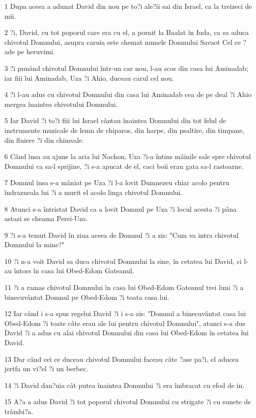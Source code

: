 \par 1 Dupa aceea a adunat David din nou pe to?i ale?ii sai din Israel, ca la treizeci de mii.
\par 2 ?i, David, cu tot poporul care era cu el, a pornit la Baalat în Iuda, ca sa aduca chivotul Domnului, asupra caruia este chemat numele Domnului Savaot Cel ce ?ade pe heruvimi.
\par 3 ?i punând chivotul Domnului într-un car nou, l-au scos din casa lui Aminadab; iar fiii lui Aminadab, Uza ?i Ahio, duceau carul cel nou.
\par 4 ?i l-au adus cu chivotul Domnului din casa lui Aminadab cea de pe deal ?i Ahio mergea înaintea chivotului Domnului.
\par 5 Iar David ?i to?i fiii lui Israel cântau înaintea Domnului din tot felul de instrumente muzicale de lemn de chiparos, din harpe, din psaltire, din timpane, din fluiere ?i din chimvale.
\par 6 Când însa au ajuns la aria lui Nachon, Uza ?i-a întins mâinile sale spre chivotul Domnului ca sa-l sprijine, ?i s-a apucat de el, caci boii erau gata sa-l rastoarne.
\par 7 Domnul însa s-a mâniat pe Uza ?i l-a lovit Dumnezeu chiar acolo pentru îndrazneala lui ?i a murit el acolo linga chivotul Domnului.
\par 8 Atunci s-a întristat David ca a lovit Domnul pe Uza ?i locul acesta ?i pâna astazi se cheama Perei-Uza.
\par 9 ?i s-a temut David în ziua aceea de Domnul ?i a zis: "Cum va intra chivotul Domnului la mine?"
\par 10 ?i n-a voit David sa duca chivotul Domnului la sine, în cetatea lui David, ci l-au întors în casa lui Obed-Edom Gateanul.
\par 11 ?i a ramas chivotul Domnului în casa lui Obed-Edom Gateanul trei luni ?i a binecuvântat Domnul pe Obed-Edom ?i toata casa lui.
\par 12 Iar când i s-a spus regelui David ?i i s-a zis: "Domnul a binecuvântat casa lui Obed-Edom ?i toate câte erau ale lui pentru chivotul Domnului", atunci s-a dus David ?i a adus cu alai chivotul Domnului din casa lui Obed-Edom în cetatea lui David.
\par 13 Dar când cei ce duceau chivotul Domnului faceau câte ?ase pa?i, el aducea jertfa un vi?el ?i un berbec.
\par 14 ?i David dan?uia cât putea înaintea Domnului ?i era îmbracat cu efod de in.
\par 15 A?a a adus David ?i tot poporul chivotul Domnului cu strigate ?i cu sunete de trâmbi?a.
